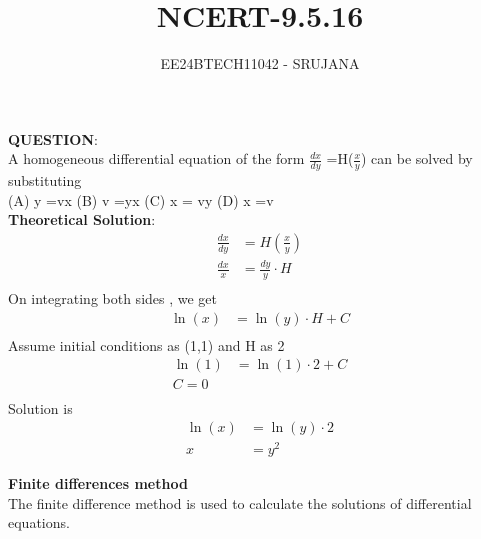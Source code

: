\documentclass[journal]{IEEEtran}
\begin{document}

\vspace{3cm}

\title{NCERT-9.5.16}
\author{EE24BTECH11042 - SRUJANA}
{\let\newpage\relax\maketitle}

\renewcommand{\thefigure}{\theenumi}
\renewcommand{\thetable}{\theenumi}
\setlength{\intextsep}{10pt} 

\renewcommand{\thetable}{\theenumi}

\textbf{QUESTION}:\\

A homogeneous differential equation of the form $\frac{dx}{dy}$ =H($\frac{x}{y}$) can be solved by substituting\\ 

(A) y =vx \hspace{2cm} (B) v =yx \hspace{2cm}
(C) x = vy \hspace{2cm} (D) x =v\\

\textbf{Theoretical Solution}:\\

\begin{align}
   \frac{dx}{dy} &= H(\frac{x}{y})  \\
   \frac{dx}{x} &= \frac{dy}{y} \cdot H\\
\end{align}
On integrating both sides , we get
\begin{align}
    \ln(x) &= \ln(y) \cdot H +C \\
\end{align}
Assume initial conditions as (1,1) and H as 2
\begin{align}
    \ln(1) &= \ln(1) \cdot 2 + C\\
    C = 0 \\
\end{align}
Solution is
\begin{align}
    \ln(x) &= \ln(y) \cdot 2\\
    x &= y^{2}
\end{align}

\textbf{Finite differences method}\\
The finite difference method is used to calculate the solutions of differential equations.\\
\end{document}
